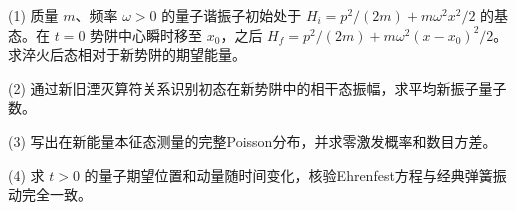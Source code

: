 (1) 质量 \(m\)、频率 \(\omega>0\) 的量子谐振子初始处于 \(H_i=p^2/(2m)+m\omega^2x^2/2\) 的基态。在 \(t=0\) 势阱中心瞬时移至 \(x_0\)，之后 \(H_f=p^2/(2m)+m\omega^2(x-x_0)^2/2\)。求淬火后态相对于新势阱的期望能量。

(2) 通过新旧湮灭算符关系识别初态在新势阱中的相干态振幅，求平均新振子量子数。

(3) 写出在新能量本征态测量的完整Poisson分布，并求零激发概率和数目方差。

(4) 求 \(t>0\) 的量子期望位置和动量随时间变化，核验Ehrenfest方程与经典弹簧振动完全一致。
